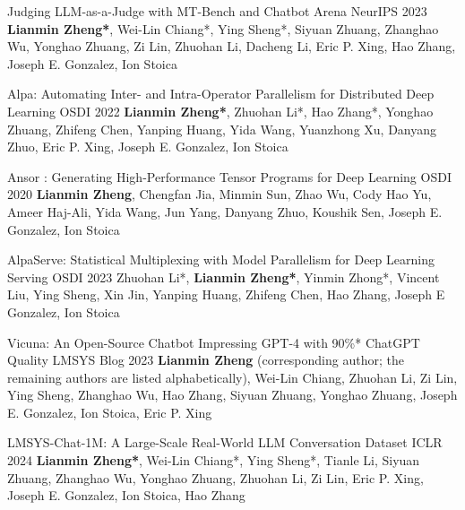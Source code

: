 
\begin{cventries}


\cventry
{}
{Judging LLM-as-a-Judge with MT-Bench and Chatbot Arena} %
{NeurIPS 2023} %
{} %
{\textbf{Lianmin Zheng*}, Wei-Lin Chiang*, Ying Sheng*, Siyuan Zhuang, Zhanghao Wu, Yonghao Zhuang, Zi Lin, Zhuohan Li, Dacheng Li, Eric P. Xing, Hao Zhang, Joseph E. Gonzalez, Ion Stoica}

\cventry
{}
{Alpa: Automating Inter- and Intra-Operator Parallelism for Distributed Deep Learning} %
{OSDI 2022} %
{} %
{\textbf{Lianmin Zheng*}, Zhuohan Li*, Hao Zhang*, Yonghao Zhuang, Zhifeng Chen, Yanping Huang, Yida Wang, Yuanzhong Xu, Danyang Zhuo, Eric P. Xing, Joseph E. Gonzalez, Ion Stoica}

\cventry
{}
{Ansor : Generating High-Performance Tensor Programs for Deep Learning} %
{OSDI 2020} %
{} %
{\textbf{Lianmin Zheng}, Chengfan Jia, Minmin Sun, Zhao Wu, Cody Hao Yu, Ameer Haj-Ali, Yida Wang, Jun Yang, Danyang Zhuo, Koushik Sen, Joseph E. Gonzalez, Ion Stoica}

\cventry
{}
{AlpaServe: Statistical Multiplexing with Model Parallelism for Deep Learning Serving} %
{OSDI 2023} %
{} %
{Zhuohan Li*, \textbf{Lianmin Zheng*}, Yinmin Zhong*, Vincent Liu, Ying Sheng, Xin Jin, Yanping Huang, Zhifeng Chen, Hao Zhang, Joseph E Gonzalez, Ion Stoica}

\cventry
{}
{Vicuna: An Open-Source Chatbot Impressing GPT-4 with 90\%* ChatGPT Quality} %
{LMSYS Blog 2023} %
{} %
{\textbf{Lianmin Zheng} (corresponding author; the remaining authors are listed alphabetically), Wei-Lin Chiang, Zhuohan Li, Zi Lin, Ying Sheng, Zhanghao Wu, Hao Zhang, Siyuan Zhuang, Yonghao Zhuang, Joseph E. Gonzalez, Ion Stoica, Eric P. Xing}

\cventry
{}
{LMSYS-Chat-1M: A Large-Scale Real-World LLM Conversation Dataset} %
{ICLR 2024} %
{} %
{\textbf{Lianmin Zheng*}, Wei-Lin Chiang*, Ying Sheng*, Tianle Li, Siyuan Zhuang, Zhanghao Wu, Yonghao Zhuang, Zhuohan Li, Zi Lin, Eric P. Xing, Joseph E. Gonzalez, Ion Stoica, Hao Zhang}


\end{cventries}



